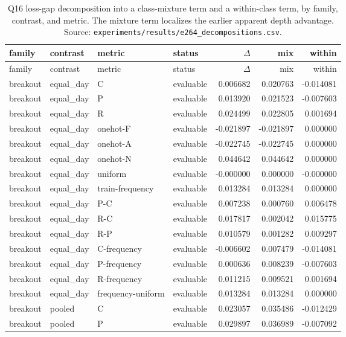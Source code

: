 \begin{longtable}{llllrrr}
\caption{Q16 loss-gap decomposition into a class-mixture term and a within-class term, by
family, contrast, and metric. The mixture term localizes the earlier apparent depth
advantage. Source: \texttt{experiments/results/e264\_decompositions.csv}.}
\label{tab:decomp}\\
\toprule
family & contrast & metric & status & $\Delta$ & mix & within \\
\midrule
\endfirsthead
\toprule
family & contrast & metric & status & $\Delta$ & mix & within \\
\midrule
\endhead
\bottomrule
\endfoot
breakout & equal\_day & C & evaluable & 0.006682 & 0.020763 & -0.014081 \\
breakout & equal\_day & P & evaluable & 0.013920 & 0.021523 & -0.007603 \\
breakout & equal\_day & R & evaluable & 0.024499 & 0.022805 & 0.001694 \\
breakout & equal\_day & onehot-F & evaluable & -0.021897 & -0.021897 & 0.000000 \\
breakout & equal\_day & onehot-A & evaluable & -0.022745 & -0.022745 & 0.000000 \\
breakout & equal\_day & onehot-N & evaluable & 0.044642 & 0.044642 & 0.000000 \\
breakout & equal\_day & uniform & evaluable & -0.000000 & 0.000000 & -0.000000 \\
breakout & equal\_day & train-frequency & evaluable & 0.013284 & 0.013284 & 0.000000 \\
breakout & equal\_day & P-C & evaluable & 0.007238 & 0.000760 & 0.006478 \\
breakout & equal\_day & R-C & evaluable & 0.017817 & 0.002042 & 0.015775 \\
breakout & equal\_day & R-P & evaluable & 0.010579 & 0.001282 & 0.009297 \\
breakout & equal\_day & C-frequency & evaluable & -0.006602 & 0.007479 & -0.014081 \\
breakout & equal\_day & P-frequency & evaluable & 0.000636 & 0.008239 & -0.007603 \\
breakout & equal\_day & R-frequency & evaluable & 0.011215 & 0.009521 & 0.001694 \\
breakout & equal\_day & frequency-uniform & evaluable & 0.013284 & 0.013284 & 0.000000 \\
breakout & pooled & C & evaluable & 0.023057 & 0.035486 & -0.012429 \\
breakout & pooled & P & evaluable & 0.029897 & 0.036989 & -0.007092 \\

\end{longtable}
